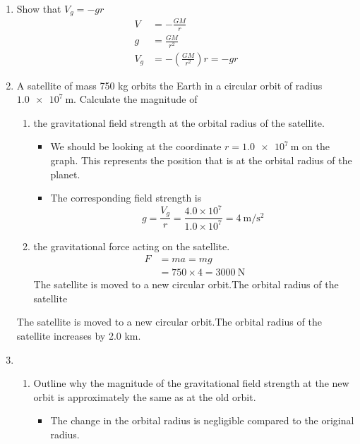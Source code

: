 \documentclass[a4paper,12pt]{article}
\begin{document}
\begin{enumerate}[label=(\alph*)]
  \item Show that $V_g = -gr$
        \begin{align*}
          V   & = -\frac{GM}{r}            \\
          g   & = \frac{GM}{r^2}           \\
          V_g & = -(\frac{GM}{r^2})r = -gr
        \end{align*}
  \item A satellite of mass 750 kg orbits the Earth in a circular orbit of radius $\SI{1.0e7}{\meter}$. Calculate the magnitude of
        \begin{enumerate}[label=(\roman*)]
          \item the gravitational field strength at the orbital radius of the satellite.
                \begin{itemize}
                  \item We should be looking at the coordinate $r = \SI{1.0e7}{\meter}$ on the graph. This represents the position that is at the orbital radius of the planet.
                  \item The corresponding field strength is $$g = \frac{V_g}{r} = \frac{4.0\times 10^7}{1.0\times 10^7} = \SI{4}{\meter\per\second\squared}$$
                \end{itemize}
          \item the gravitational force acting on the satellite.
                \begin{align*}
                  F & = ma = mg                           \\
                    & = 750 \times 4 = \SI{3000}{\newton}
                \end{align*}
                The satellite is moved to a new circular orbit.The orbital radius of the satellite
        \end{enumerate}
        The satellite is moved to a new circular orbit.The orbital radius of the satellite increases by 2.0 km.
  \item \begin{enumerate}[label=(\roman*)]
          \item Outline why the magnitude of the gravitational field strength at the new orbit is approximately the same as at the old orbit.
                \begin{itemize}
                  \item The change in the orbital radius is negligible compared to the original radius.

\end{itemize}
\end{enumerate}
\end{enumerate}
\end{document}
